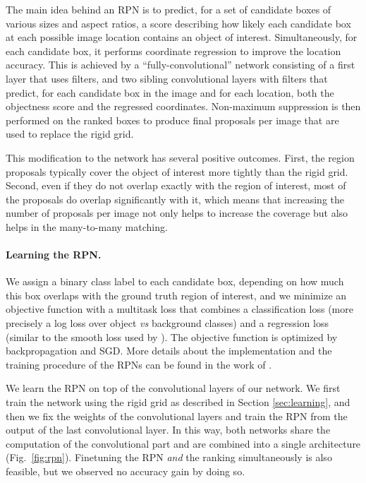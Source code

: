 \documentclass[twocolumn]{svjour3}          \smartqed  \usepackage{graphicx}
\begin{document}
The main idea behind an RPN is to predict, for a set of candidate boxes of various sizes and aspect ratios, a score describing how likely each candidate box at each possible image location contains an object of interest.
 Simultaneously, for each candidate box, it performs coordinate regression to improve the location accuracy.
This is achieved by a ``fully-convolutional'' network consisting of a first layer that uses  filters, and two sibling convolutional layers with  filters that predict, for each candidate box in the image and for each location, both the objectness score and the regressed coordinates. Non-maximum suppression is then performed on the ranked boxes to produce  final proposals per image that are used to replace the rigid grid.

This modification to the network has several positive outcomes. First, the region proposals typically cover the object of interest more tightly than the rigid grid. Second, even if they do not overlap exactly with the region of interest, most of the proposals do overlap significantly with it, which means that increasing the number of proposals per image not only helps to increase the coverage but also helps in the many-to-many matching.

\paragraph{Learning the RPN.} We assign a binary class label to each candidate box, depending on how much
this box overlaps with the ground truth region of interest, and we minimize an objective function with a multitask loss that combines a
classification loss (more precisely a log loss over object \emph{vs} background classes)
and a regression loss (similar to the smooth  loss used by \cite{Girshick2015}). The objective function is optimized by backpropagation and SGD.
More details about the implementation and the training procedure of the RPNs can be found in the work of \cite{Ren2015faster}.

We learn the RPN on top of the convolutional layers of our network. We first train the network using the rigid grid as described in Section \ref{sec:learning}, and then we fix the weights of the convolutional layers and train the RPN from the output of the last convolutional layer. In this way, both networks share the computation of the convolutional part and are combined into a single architecture (Fig.~\ref{fig:rpn}). Finetuning the RPN \emph{and} the ranking simultaneously is also feasible, but we observed no accuracy gain by doing so. 
\end{document}
